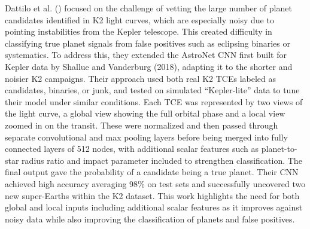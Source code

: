 \documentclass[letterpaper]{article} %
\begin{document}
Dattilo et al. (\citeyear{Dattilo2019identifyexoplanetsII}) focused on the challenge of vetting the large number of planet candidates identified in K2 light curves, which are especially noisy due to pointing instabilities from the Kepler telescope. This created difficulty in classifying true planet signals from false positives such as eclipsing binaries or systematics. To address this, they extended the AstroNet CNN first built for Kepler data by Shallue and Vanderburg (2018), adapting it to the shorter and noisier K2 campaigns. Their approach used both real K2 TCEs labeled as candidates, binaries, or junk, and tested on simulated ``Kepler-lite'' data to tune their model under similar conditions. Each TCE was represented by two views of the light curve, a global view showing the full orbital phase and a local view zoomed in on the transit. These were normalized and then passed through separate convolutional and max pooling layers before being merged into fully connected layers of 512 nodes, with additional scalar features such as planet-to-star radius ratio and impact parameter included to strengthen classification. The final output gave the probability of a candidate being a true planet. Their CNN achieved high accuracy averaging 98\% on test sets and successfully uncovered two new super-Earths within the K2 dataset. This work highlights the need for both global and local inputs including additional scalar features as it improves against noisy data while also improving the classification of planets and false positives.
\end{document}
